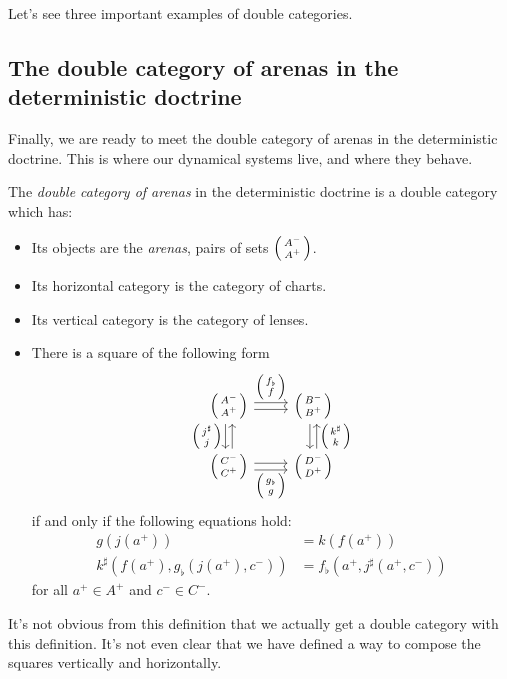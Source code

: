\documentclass[DynamicalBook]{subfiles}
\begin{document}
Let's see three important examples of double categories.

\subsection{The double category of arenas in the deterministic doctrine}

Finally, we are ready to meet the double category of arenas in the deterministic
doctrine. This is where our dynamical
systems live, and where they behave.

\begin{definition}\label{def.double_category_of_arenas_discrete}
  The \emph{double category of arenas} in the deterministic doctrine is a double
  category which has:
  \begin{itemize}
  \item Its objects are the \emph{arenas}, pairs of sets $\lens{A^-}{A^+}$.
  \item Its horizontal category is the category of charts.
  \item Its vertical category is the category of lenses.
  \item There is a square of the following form
    \begin{equation}\label{eqn.dbl_cat_arena_square}
      \begin{tikzcd}
        \lens{A^-}{A^+} \ar[r, shift left, "\lens{f_{\flat}}{f}"] \ar[r, shift
        right] \ar[d, shift right, "\lens{j^{\sharp}}{j}"'] \ar[d, shift left,
        leftarrow] & \lens{B^-}{B^+} \ar[d, shift left, leftarrow,
        "\lens{k^{\sharp}}{k}"] \ar[d, shift right]\\
        \lens{C^-}{C^+} \ar[r, shift right, "\lens{g_{\flat}}{g}"'] \ar[r,
        shift left] & \lens{D^-}{D^+}
      \end{tikzcd}
    \end{equation}
    if and only if the following equations hold:
    \begin{align}\label{eqn.dbl_cat_arena_square_commuting}
      g(j(a^+)) &= k(f(a^+)) \\
      k^{\sharp}(f(a^+), g_{\flat}(j(a^+), c^-)) &= f_{\flat}(a^+, j^{\sharp}(a^+, c^-)) 
    \end{align}
    for all $a^+ \in A^+$ and $c^- \in C^-$.
  \end{itemize}
\end{definition}

It's not obvious from this definition that we actually get a double category
with this definition. It's not even clear that we have defined a way to compose
the squares vertically and horizontally.
\end{document}
